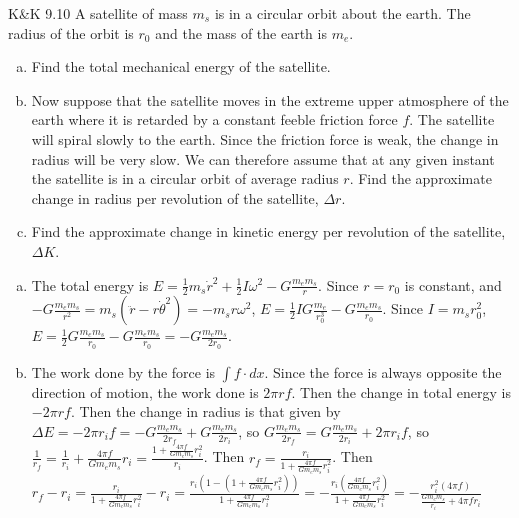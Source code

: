 \documentclass{esg8012pset}
\begin{document}
\begin{solution}
\begin{problem}{K\&K 9.10}
  A satellite of mass $m_s$ is in a circular orbit about the earth. The radius of the orbit is $r_0$ and the mass of the earth is $m_e$.
  \begin{enumerate}[(a)]
    \item Find the total mechanical energy of the satellite.
    \item Now suppose that the satellite moves in the extreme upper atmosphere of the earth where it is retarded by a constant feeble friction force $f$. The satellite will spiral slowly to the earth. Since the friction force is weak, the change in radius will be very slow. We can therefore assume that at any given instant the satellite is in a circular orbit of average radius $r$. Find the approximate change in radius per revolution of the satellite, $\Delta r$.
    \item Find the approximate change in kinetic energy per revolution of the satellite, $\Delta K$.
  \end{enumerate}
\end{problem}
\begin{solution}
\begin{enumerate}[(a)]
  \item The total energy is $E = \frac12 m_s \dot r^2 + \frac12 I\omega^2 - G\frac{m_e m_s}{r}$.  Since $r = r_0$ is constant, and $-G \frac{m_e m_s}{r^2} = m_s (\ddot r - r\dot\theta^2) = - m_s r \omega^2$, $E = \frac12 I G \frac{m_e}{r_0^3} - G\frac{m_e m_s}{r_0}$.   Since $I = m_s r_0^2$, $E = \frac12 G \frac{m_e m_s}{r_0} - G\frac{m_e m_s}{r_0} = -G\frac{m_e m_s}{2r_0}$.
  \item The work done by the force is $\int f \cdot d x$.  Since the force is always opposite the direction of motion, the work done is $2\pi r f$.  Then the change in total energy is $-2\pi r f$.  Then the change in radius is that given by $\Delta E = -2\pi r_i f = -G\frac{m_e m_s}{2r_f} + G\frac{m_e m_s}{2r_i}$, so $G\frac{m_e m_s}{2r_f} = G\frac{m_e m_s}{2r_i} + 2\pi r_i f$, so $\frac{1}{r_f} = \frac{1}{r_i} + \frac{4\pi f}{G m_e m_s} r_i = \frac{1 + \frac{4\pi f}{G m_e m_s} r_i^2}{r_i}$.  Then $r_f = \frac{r_i}{1 + \frac{4\pi f}{G m_e m_s} r_i^2}$.  Then $r_f - r_i = \frac{r_i}{1 + \frac{4\pi f}{G m_e m_s} r_i^2} - r_i = \frac{r_i\left(1-\left(1 + \frac{4\pi f}{G m_e m_s} r_i^2\right)\right)}{1 + \frac{4\pi f}{G m_e m_s} r_i^2} = -\frac{r_i\left(\frac{4\pi f}{G m_e m_s} r_i^2\right)}{1 + \frac{4\pi f}{G m_e m_s} r_i^2} = -\frac{r_i^2(4\pi f)}{\frac{G m_e m_s}{r_i} + 4\pi f r_i}$

\end{enumerate}
\end{solution}
\end{solution}
\end{document}
